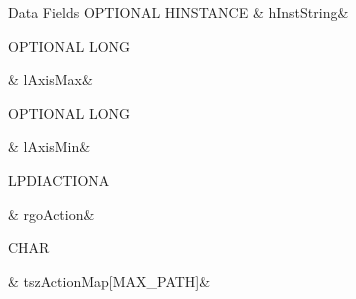 \begin{DoxyFields}{Data Fields}
\hypertarget{a00003_af23659cd7790add805fab421d16090c9}{O\-P\-T\-I\-O\-N\-A\-L H\-I\-N\-S\-T\-A\-N\-C\-E}\label{a00003_af23659cd7790add805fab421d16090c9}
&
h\-Inst\-String&
\\
\hline

\hypertarget{a00003_abf71f27dd08ea4a40d16576705b92da5}{O\-P\-T\-I\-O\-N\-A\-L L\-O\-N\-G}\label{a00003_abf71f27dd08ea4a40d16576705b92da5}
&
l\-Axis\-Max&
\\
\hline

\hypertarget{a00003_ae03184d3b70774f29a59f1c589f3112e}{O\-P\-T\-I\-O\-N\-A\-L L\-O\-N\-G}\label{a00003_ae03184d3b70774f29a59f1c589f3112e}
&
l\-Axis\-Min&
\\
\hline

\hypertarget{a00003_a553a9a74d3d7b187c4e779e049a4b390}{L\-P\-D\-I\-A\-C\-T\-I\-O\-N\-A}\label{a00003_a553a9a74d3d7b187c4e779e049a4b390}
&
rgo\-Action&
\\
\hline

\hypertarget{a00003_a466ec4e4d249369b47d804560c4b68db}{C\-H\-A\-R}\label{a00003_a466ec4e4d249369b47d804560c4b68db}
&
tsz\-Action\-Map\mbox{[}M\-A\-X\-\_\-\-P\-A\-T\-H\mbox{]}&
\\
\hline

\end{DoxyFields}
\label{d9/d2e/a00056}
\hypertarget{a00003_d9/d2e/a00056}{}
